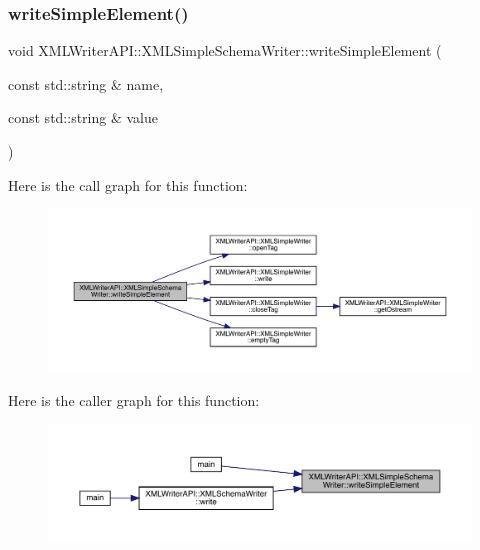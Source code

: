 \subsubsection{\texorpdfstring{writeSimpleElement()}{writeSimpleElement()}\hspace{0.1cm}{\footnotesize\ttfamily [1/20]}}
{\footnotesize\ttfamily void X\+M\+L\+Writer\+A\+P\+I\+::\+X\+M\+L\+Simple\+Schema\+Writer\+::write\+Simple\+Element (\begin{DoxyParamCaption}\item[{const std\+::string \&}]{name,  }\item[{const std\+::string \&}]{value }\end{DoxyParamCaption})\hspace{0.3cm}{\ttfamily [inline]}}

Here is the call graph for this function\+:
\nopagebreak
\begin{figure}[H]
\begin{center}
\leavevmode
\includegraphics[width=350pt]{db/d0b/classXMLWriterAPI_1_1XMLSimpleSchemaWriter_a312669330ac26b8849f671ea23ea60de_cgraph}
\end{center}
\end{figure}
Here is the caller graph for this function\+:\nopagebreak
\begin{figure}[H]
\begin{center}
\leavevmode
\includegraphics[width=350pt]{db/d0b/classXMLWriterAPI_1_1XMLSimpleSchemaWriter_a312669330ac26b8849f671ea23ea60de_icgraph}
\end{center}
\end{figure}
\mbox{\label{classXMLWriterAPI_1_1XMLSimpleSchemaWriter_a312669330ac26b8849f671ea23ea60de}} 
